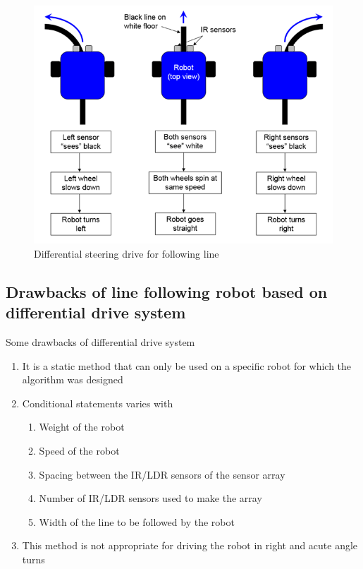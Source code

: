 \documentclass[14pt,a4paper]{extarticle}
\begin{document}
		\begin{figure}[H]
			\includegraphics[width=\textwidth]{line-tracking-robot-steering.png}
			\caption{Differential steering drive for following line}
			\label{fig:differential_drive_image}
		\end{figure}
		
	
	\subsection{Drawbacks of line following robot based on differential drive system}
	
	Some drawbacks of differential drive system
	
		\begin{enumerate}
		\item It is a static method that can only be used on a specific robot for which the algorithm was designed
		\item Conditional statements varies with 
			\begin{enumerate}
				\item Weight of the robot
				\item Speed of the robot
				\item Spacing between the IR/LDR sensors of the sensor array
				\item Number of IR/LDR sensors used to make the array
				\item Width of the line to be followed by the robot
			\end{enumerate}
		
		\item This method is not appropriate for driving the robot in right and acute angle turns
		
		
		\end{enumerate}
		
\end{document}
